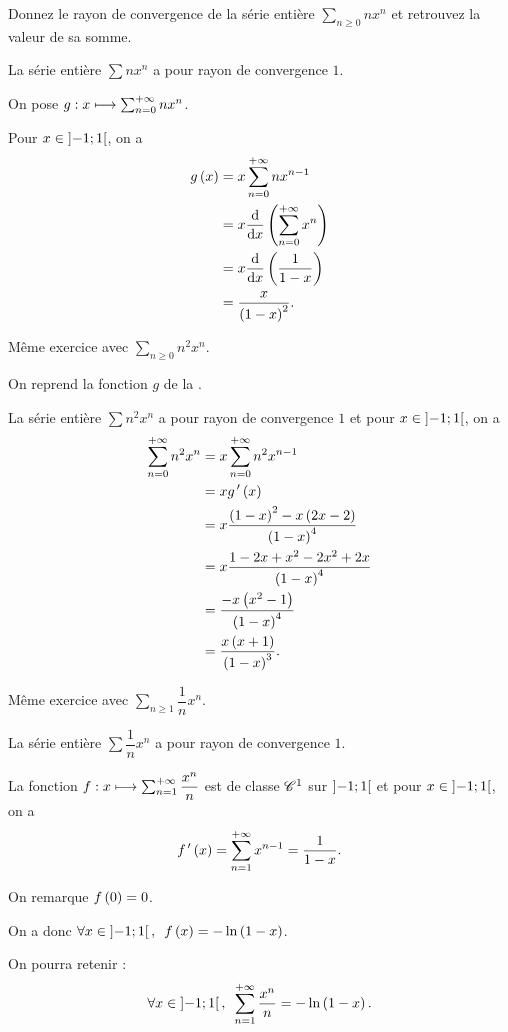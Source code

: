 \begin{exo}
Donnez le rayon de convergence de la série entière \(\sum_{n\geq0}nx^n\) et retrouvez la valeur de sa somme.
\end{exo}

\begin{corr}
La série entière \(\sum nx^n\) a pour rayon de convergence \(1\).

On pose \(g:x\longmapsto\sum_{n=0}^{+\infty}nx^n\).

Pour \(x\in\left]-1;1\right[\), on a \[\begin{aligned}
g\paren{x}&=x\sum_{n=0}^{\pinf}nx^{n-1} \\
&=x\odv*{\paren{\sum_{n=0}^{\pinf}x^n}}{x} \\
&=x\odv*{\paren{\dfrac{1}{1-x}}}{x} \\
&=\dfrac{x}{\paren{1-x}^2}.
\end{aligned}\]
\end{corr}

\begin{exo}
Même exercice avec \(\sum_{n\geq0}n^2x^n\).
\end{exo}

\begin{corr}
On reprend la fonction \(g\) de la .

La série entière \(\sum n^2x^n\) a pour rayon de convergence \(1\) et pour \(x\in\left]-1;1\right[\), on a \[\begin{aligned}
\sum_{n=0}^{+\infty}n^2x^n&=x\sum_{n=0}^{+\infty}n^2x^{n-1} \\
&=xg^{\,\prime}\left(x\right) \\
&=x\dfrac{\left(1-x\right)^2-x\left(2x-2\right)}{\left(1-x\right)^4} \\
&=x\dfrac{1-2x+x^2-2x^2+2x}{\left(1-x\right)^4} \\
&=\dfrac{-x\left(x^2-1\right)}{\left(1-x\right)^4} \\
&=\dfrac{x\left(x+1\right)}{\left(1-x\right)^3}.
\end{aligned}\]
\end{corr}

\begin{exo}
Même exercice avec \(\sum_{n\geq1}\dfrac{1}{n}x^n\).
\end{exo}

\begin{corr}
La série entière \(\sum\dfrac{1}{n}x^n\) a pour rayon de convergence \(1\).

La fonction \(f:x\longmapsto\sum_{n=1}^{+\infty}\dfrac{x^n}{n}\) est de classe \(\mathscr{C}^{1}\) sur \(\left]-1;1\right[\) et pour \(x\in\left]-1;1\right[\), on a \[f^{\,\prime}\left(x\right)=\sum_{n=1}^{+\infty}x^{n-1}=\dfrac{1}{1-x}.\]

On remarque \(f\left(0\right)=0\).

On a donc \(\quantifs{\forall x\in\intervee{-1}{1}}f\paren{x}=-\ln\paren{1-x}\).

On pourra retenir : \[\quantifs{\forall x\in\intervee{-1}{1}}\sum_{n=1}^{\pinf}\dfrac{x^n}{n}=-\ln\paren{1-x}.\]
\end{corr}

